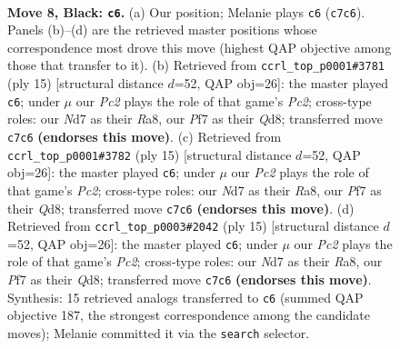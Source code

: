 \documentclass[11pt]{article}
\begin{document}
\begin{figure}[p]\centering
\begin{subfigure}{0.46\textwidth}\centering
\resizebox{\linewidth}{!}{%
\newchessgame
\chessboard[
  setfen={r1b1qrk1/pppnppbp/3p1np1/8/2PPP2P/2N2NP1/PP3PB1/R1BQK2R b KQ - 0 8},
  showmover=false,
  pgfstyle=straightmove, color=movearrow, markmove={c7-c6}
]}
\caption{}
\end{subfigure}\hfill
\begin{subfigure}{0.46\textwidth}\centering
\resizebox{\linewidth}{!}{%
\newchessgame
\chessboard[
  setfen={r1bq1rk1/pppn1pbp/3p1np1/4p3/2PPP3/2N2NP1/PP3PBP/R1BQ1RK1 b - - 0 8},
  showmover=false,
  pgfstyle=straightmove, color=movearrow, markmove={c7-c6}
]}
\caption{}
\end{subfigure}
\\[4pt]
\begin{subfigure}{0.46\textwidth}\centering
\resizebox{\linewidth}{!}{%
\newchessgame
\chessboard[
  setfen={r1bq1rk1/pppn1pbp/3p1np1/4p3/2PPP3/2N2NP1/PP3PBP/R1BQ1RK1 b - - 0 8},
  showmover=false,
  pgfstyle=straightmove, color=movearrow, markmove={c7-c6}
]}
\caption{}
\end{subfigure}\hfill
\begin{subfigure}{0.46\textwidth}\centering
\resizebox{\linewidth}{!}{%
\newchessgame
\chessboard[
  setfen={r1bq1rk1/pppn1pbp/3p1np1/4p3/2PPP3/2N2NP1/PP3PBP/R1BQ1RK1 b - - 0 8},
  showmover=false,
  pgfstyle=straightmove, color=movearrow, markmove={c7-c6}
]}
\caption{}
\end{subfigure}
\caption{\textbf{Move 8, Black: \texttt{c6}.} (a) Our position; Melanie plays \texttt{c6} (\texttt{c7c6}). Panels (b)--(d) are the retrieved master positions whose correspondence most drove this move (highest QAP objective among those that transfer to it). (b) Retrieved from \texttt{ccrl\_top\_p0001\#3781} (ply 15) [structural distance $d$=52, QAP obj=26]: the master played \texttt{c6}; under $\mu$ our \emph{Pc2} plays the role of that game's \emph{Pc2}; cross-type roles: our \emph{N}d7 as their \emph{R}a8, our \emph{P}f7 as their \emph{Q}d8; transferred move \texttt{c7c6} \textbf{(endorses this move)}. (c) Retrieved from \texttt{ccrl\_top\_p0001\#3782} (ply 15) [structural distance $d$=52, QAP obj=26]: the master played \texttt{c6}; under $\mu$ our \emph{Pc2} plays the role of that game's \emph{Pc2}; cross-type roles: our \emph{N}d7 as their \emph{R}a8, our \emph{P}f7 as their \emph{Q}d8; transferred move \texttt{c7c6} \textbf{(endorses this move)}. (d) Retrieved from \texttt{ccrl\_top\_p0003\#2042} (ply 15) [structural distance $d$=52, QAP obj=26]: the master played \texttt{c6}; under $\mu$ our \emph{Pc2} plays the role of that game's \emph{Pc2}; cross-type roles: our \emph{N}d7 as their \emph{R}a8, our \emph{P}f7 as their \emph{Q}d8; transferred move \texttt{c7c6} \textbf{(endorses this move)}. Synthesis: 15 retrieved analogs transferred to \texttt{c6} (summed QAP objective 187, the strongest correspondence among the candidate moves); Melanie committed it via the \texttt{search} selector.}
\label{fig:thought-m15}
\end{figure}
\end{document}

